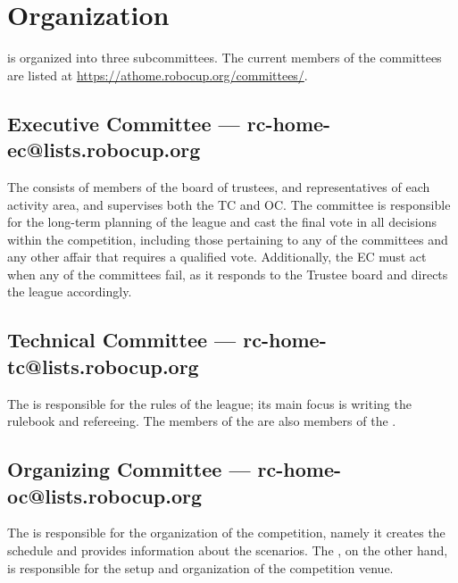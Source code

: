 \section{Organization}

\AtHome{} is organized into three subcommittees. The current members of the committees are listed at \url{https://athome.robocup.org/committees/}.

\subsection{Executive Committee --- rc-home-ec@lists.robocup.org}\label{sec:ec}

The \EC{} consists of members of the board of trustees, and representatives of each activity area, and supervises both the TC and OC.
The committee is responsible for the long-term planning of the league and cast the final vote in all decisions within the competition, including those pertaining to any of the committees and any other affair that requires a qualified vote.
Additionally, the EC must act when any of the committees fail, as it responds to the Trustee board and directs the league accordingly.

\subsection{Technical Committee --- rc-home-tc@lists.robocup.org}\label{sec:tc}

The \TC{} is responsible for the rules of the league; its main focus is writing the rulebook and refereeing.
The members of the \EC{} are also members of the \TC{}.

\subsection{Organizing Committee --- rc-home-oc@lists.robocup.org}\label{sec:oc}

The \OC{} is responsible for the organization of the competition, namely it creates the schedule and provides information about the scenarios.
The \LOC{}, on the other hand, is responsible for the setup and organization of the competition venue.
